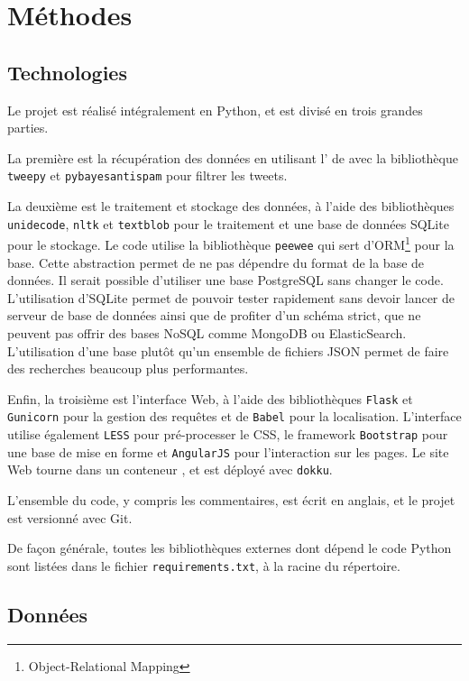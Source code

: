 
\section{Méthodes}

\subsection{Technologies}

Le projet est réalisé intégralement en Python, et est divisé en trois grandes
parties.

La première est la récupération des données en utilisant l’\api{} de \twt{}
avec la bibliothèque \verb|tweepy| et \verb|pybayesantispam| pour filtrer les
tweets.

La deuxième est le traitement et stockage des données, à l’aide des
bibliothèques \verb|unidecode|, \verb|nltk| et \verb|textblob| pour le
traitement et une base de données SQLite pour le stockage. Le code utilise la
bibliothèque \verb|peewee| qui sert d’ORM\footnote{Object-Relational Mapping}
pour la base. Cette abstraction permet de ne pas dépendre du format de la base
de données. Il serait possible d’utiliser une base PostgreSQL sans changer le
code. L’utilisation d’SQLite permet de pouvoir tester rapidement sans devoir
lancer de serveur de base de données ainsi que de profiter d’un schéma strict,
que ne peuvent pas offrir des bases NoSQL comme MongoDB ou ElasticSearch.
L’utilisation d’une base plutôt qu’un ensemble de fichiers JSON permet de faire
des recherches beaucoup plus performantes.

Enfin, la troisième est l’interface Web, à l’aide des bibliothèques
\verb|Flask| et \verb|Gunicorn| pour la gestion des requêtes et de \verb|Babel|
pour la localisation. L’interface utilise également \verb|LESS| pour
pré-processer le CSS, le framework \verb|Bootstrap| pour une base de mise en
forme et \verb|AngularJS| pour l’interaction sur les pages. Le site Web tourne
dans un conteneur , et est déployé avec \verb|dokku|.

L’ensemble du code, y compris les commentaires, est écrit en anglais, et le
projet est versionné avec Git.

De façon générale, toutes les bibliothèques externes dont dépend le code Python
sont listées dans le fichier \verb|requirements.txt|, à la racine du
répertoire.

\subsection{Données}

